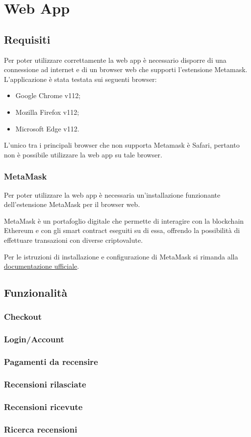 \section{Web App}

\subsection{Requisiti}
Per poter utilizzare correttamente la web app è necessario disporre di una connessione ad internet e di un browser web che supporti l'estensione Metamask. L'applicazione è stata testata sui seguenti browser:
\begin{itemize}
    \item Google Chrome v112;
    \item Mozilla Firefox v112;
    \item Microsoft Edge v112.
\end{itemize}
L'unico tra i principali browser che non supporta Metamask è Safari, pertanto non è possibile utilizzare la web app su tale browser.

\subsubsection{MetaMask}
Per poter utilizzare la web app è necessaria un'installazione funzionante dell'estensione MetaMask per il browser web.

MetaMask è un portafoglio digitale che permette di interagire con la blockchain Ethereum e con gli smart contract eseguiti su di essa, offrendo la possibilità di effettuare transazioni con diverse criptovalute.

Per le istruzioni di installazione e configurazione di MetaMask si rimanda alla \href{https://support.metamask.io/hc/en-us/articles/360015489531-Getting-started-with-MetaMask}{documentazione ufficiale}.

\subsection{Funzionalità}

\subsubsection{Checkout}

\subsubsection{Login/Account}

\subsubsection{Pagamenti da recensire}

\subsubsection{Recensioni rilasciate}

\subsubsection{Recensioni ricevute}

\subsubsection{Ricerca recensioni}